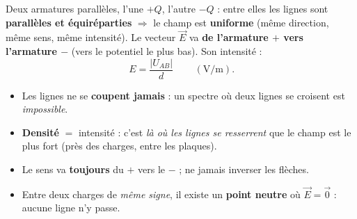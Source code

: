 \documentclass[11pt,a4paper]{article}
\newcommand{\vv}[1]{\vec{#1}}\newcommand{\ds}{\displaystyle}
\begin{document}
\begin{cle}
Deux armatures parallèles, l'une $+Q$, l'autre $-Q$ : entre elles les lignes sont \textbf{parallèles
et équiréparties} $\Rightarrow$ le champ est \textbf{uniforme} (même direction, même sens, même
intensité). Le vecteur $\vv{E}$ va \textbf{de l'armature $+$ vers l'armature $-$} (vers le potentiel
le plus bas). Son intensité :
\[ \boxed{\,E = \dfrac{|U_{AB}|}{d}\,}\qquad(\si{\volt\per\metre}). \]
\end{cle}

\begin{center}
\end{center}

\begin{piege}
\begin{itemize}[leftmargin=1.5em,topsep=1pt,itemsep=1pt]
  \item Les lignes ne se \textbf{coupent jamais} : un spectre où deux lignes se croisent est
        \emph{impossible}.
  \item \textbf{Densité} $=$ intensité : c'est \emph{là où les lignes se resserrent} que le champ
        est le plus fort (près des charges, entre les plaques).
  \item Le sens va \textbf{toujours} du $+$ vers le $-$ ; ne jamais inverser les flèches.
  \item Entre deux charges de \emph{même signe}, il existe un \textbf{point neutre} où $\vv{E} =
        \vv{0}$ : aucune ligne n'y passe.
\end{itemize}
\end{piege}
\end{document}
